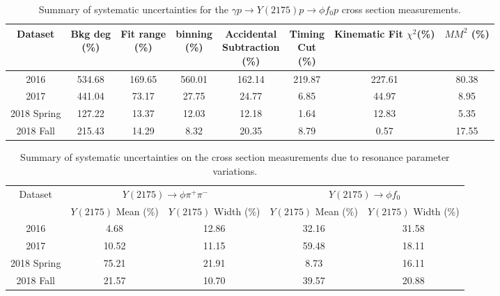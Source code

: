 \begin{table}[!htbp]
    \small
    \centering
    \caption{Summary of systematic uncertainties for the $\gamma p \rightarrow Y(2175) p \rightarrow \phi f_{0} p$ cross section measurements.}
    \label{tab.y2175.syserr.yphifo.1.1}
    \begin{tabular}{|c|c|c|c|c|c|c|c|}
        \hline
        Dataset&\thead{Bkg deg\\(\%)}&\thead{Fit range\\(\%)}&\thead{binning\\(\%)}&\thead{Accidental\\Subtraction\\(\%)}&\thead{Timing\\Cut\\(\%)}&\thead{Kinematic\\Fit $\chi^{2}$(\%)}&\thead{$MM^{2}$\\(\%)}\\
        \hline
        2016 & 534.68 & 169.65 & 560.01 & 162.14 & 219.87 & 227.61 & 80.38 \\ 
        2017 & 441.04 & 73.17 & 27.75 & 24.77 & 6.85 & 44.97 & 8.95 \\ 
        2018 Spring & 127.22 & 13.37 & 12.03 & 12.18 & 1.64 & 12.83 & 5.35 \\ 
        2018 Fall & 215.43 & 14.29 & 8.32 & 20.35 & 8.79 & 0.57 & 17.55 \\
        \hline
    \end{tabular}
\end{table}

\begin{table}[!htbp]
    \small
    \centering
    \caption{Summary of systematic uncertainties on the cross section measurements due to resonance parameter variations.}
    \label{tab.y2175.syserr.y}
    \begin{tabular}{|c|c|c|c|c|}
        \hline
        \multirow{2}{*}{Dataset} & \multicolumn{2}{c|}{$Y(2175)\rightarrow \phi \pi^{+} \pi^{-}$} & \multicolumn{2}{c|}{$Y(2175)\rightarrow \phi f_0$} \\
        \cline{2-5}
        & \thead{$Y(2175)$ Mean\\($\%$)} & \thead{$Y(2175)$ Width\\($\%$)} & \thead{$Y(2175)$ Mean\\($\%$)} & \thead{$Y(2175)$ Width\\($\%$)} \\
        \hline
        2016 & 4.68 & 12.86 & 32.16 & 31.58 \\ 
        2017 & 10.52 & 11.15 & 59.48 & 18.11 \\ 
        2018 Spring & 75.21 & 21.91 & 8.73 & 16.11 \\ 
        2018 Fall & 21.57 & 10.70 & 39.57 & 20.88 \\
        \hline
    \end{tabular}
\end{table}

